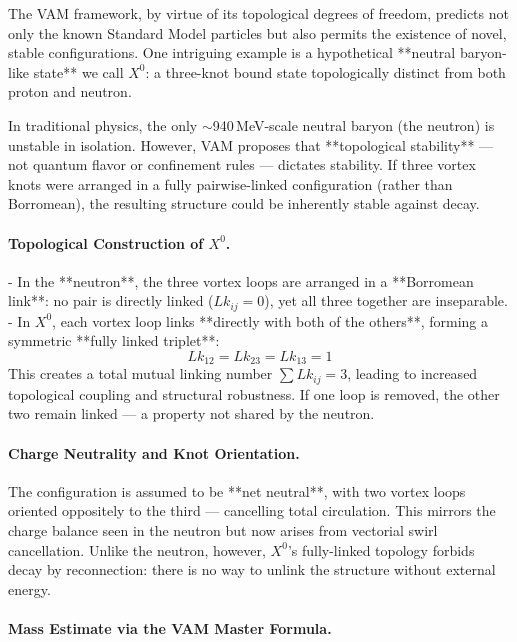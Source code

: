 The VAM framework, by virtue of its topological degrees of freedom, predicts not only the known Standard Model particles but also permits the existence of novel, stable configurations. One intriguing example is a hypothetical **neutral baryon-like state** we call $X^0$: a three-knot bound state topologically distinct from both proton and neutron.

In traditional physics, the only $\sim$940\,MeV-scale neutral baryon (the neutron) is unstable in isolation. However, VAM proposes that **topological stability** — not quantum flavor or confinement rules — dictates stability. If three vortex knots were arranged in a fully pairwise-linked configuration (rather than Borromean), the resulting structure could be inherently stable against decay.

\paragraph{Topological Construction of $X^0$.}

- In the **neutron**, the three vortex loops are arranged in a **Borromean link**: no pair is directly linked ($Lk_{ij}=0$), yet all three together are inseparable.
- In $X^0$, each vortex loop links **directly with both of the others**, forming a symmetric **fully linked triplet**:
  \[
  Lk_{12} = Lk_{23} = Lk_{13} = 1
  \]
  This creates a total mutual linking number $\sum Lk_{ij} = 3$, leading to increased topological coupling and structural robustness. If one loop is removed, the other two remain linked — a property not shared by the neutron.

\paragraph{Charge Neutrality and Knot Orientation.}

The configuration is assumed to be **net neutral**, with two vortex loops oriented oppositely to the third — cancelling total circulation. This mirrors the charge balance seen in the neutron but now arises from vectorial swirl cancellation. Unlike the neutron, however, $X^0$’s fully-linked topology forbids decay by reconnection: there is no way to unlink the structure without external energy.

\paragraph{Mass Estimate via the VAM Master Formula.}

